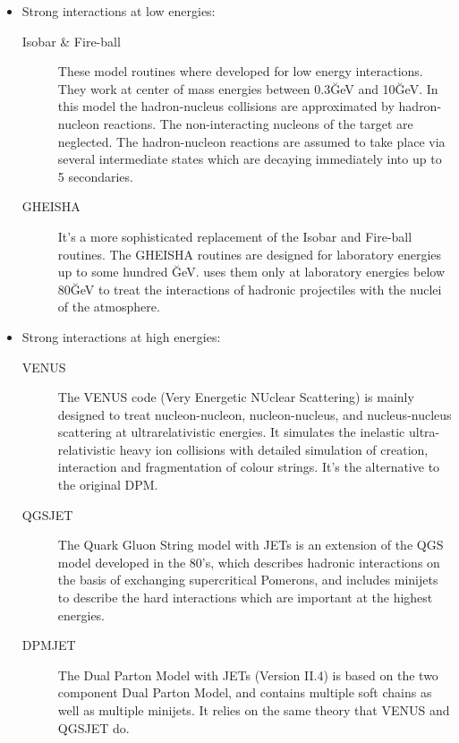 \begin{itemize}
  
\item Strong interactions at low energies:

\begin{description}
\item[Isobar \& Fire-ball] These model routines where developed
  \cite{Grieder:1979} for low energy interactions. They work at center
  of mass energies between 0.3\u{GeV} and 10\u{GeV}. In this model the
  hadron-nucleus collisions are approximated by hadron-nucleon
  reactions. The non-interacting nucleons of the target are neglected.
  The hadron-nucleon reactions are assumed to take place via several
  intermediate states which are decaying immediately into up to 5
  secondaries.
  
\item[GHEISHA] It's a more sophisticated replacement of the Isobar and
  Fire-ball routines. The GHEISHA routines are designed for laboratory
  energies up to some hundred \u{GeV}. \CORSIKA uses them only at
  laboratory energies below 80\u{GeV} to treat the interactions of
  hadronic projectiles with the nuclei of the atmosphere.
\end{description}

\item Strong interactions at high energies:

\begin{description}
\item[VENUS] The VENUS code (Very Energetic NUclear Scattering) is
  mainly designed to treat nucleon-nucleon, nucleon-nucleus, and
  nucleus-nucleus scattering at ultrarelativistic energies. It
  simulates the inelastic ultra-relativistic heavy ion collisions with
  detailed simulation of creation, interaction and fragmentation of
  colour strings. It's the alternative to the original DPM.
  
\item[QGSJET] The Quark Gluon String model with JETs is an
  extension of the QGS model developed in the 80's, which describes
  hadronic interactions on the basis of exchanging supercritical
  Pomerons, and includes minijets to describe the hard interactions
  which are important at the highest energies.
  
\item[DPMJET] The Dual Parton Model with JETs (Version II.4) is based
  on the two component Dual Parton Model\cite{Capella:1980}, and
  contains multiple soft chains as well as multiple minijets. It
  relies on the same theory that VENUS and QGSJET do.
  

\end{description}
\end{itemize}
